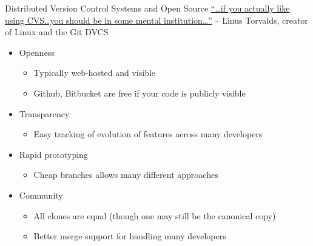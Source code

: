 \documentclass{beamer}
\begin{document}
\begin{frame}{Distributed Version Control Systems and Open Source}
\href{http://www.youtube.com/watch?v=4XpnKHJAok8&t=8m30s}{
``\ldots if you actually like using CVS\ldots you should be in some mental institution\ldots''}
\hfill -- Linus Torvalds, creator of Linux and the Git DVCS \\
\bigskip
\begin{itemize}
\item Openness
\begin{itemize}
\item Typically web-hosted and visible
\item Github, Bitbucket are free if your code is publicly visible
\end{itemize}
\item Transparency
\begin{itemize}
\item Easy tracking of evolution of features across many developers
\end{itemize}
\item Rapid prototyping
\begin{itemize}
\item Cheap branches allows many different approaches
\end{itemize}
\item Community
\begin{itemize}
\item All clones are equal (though one may still be the canonical copy)
\item Better merge support for handling many developers
\end{itemize}
\end{itemize}
\end{frame}
\end{document}
